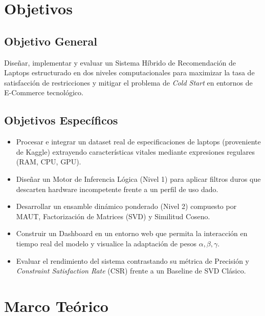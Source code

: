 \documentclass[12pt,a4paper]{report}
\begin{document}
\chapter{Objetivos}
\section{Objetivo General}
Diseñar, implementar y evaluar un Sistema Híbrido de Recomendación de Laptops estructurado en dos niveles computacionales para maximizar la tasa de satisfacción de restricciones y mitigar el problema de \textit{Cold Start} en entornos de E-Commerce tecnológico.

\section{Objetivos Específicos}
\begin{itemize}
    \item Procesar e integrar un dataset real de especificaciones de laptops (proveniente de Kaggle) extrayendo características vitales mediante expresiones regulares (RAM, CPU, GPU).
    \item Diseñar un Motor de Inferencia Lógica (Nivel 1) para aplicar filtros duros que descarten hardware incompetente frente a un perfil de uso dado.
    \item Desarrollar un ensamble dinámico ponderado (Nivel 2) compuesto por MAUT, Factorización de Matrices (SVD) y Similitud Coseno.
    \item Construir un Dashboard en un entorno web que permita la interacción en tiempo real del modelo y visualice la adaptación de pesos $\alpha, \beta, \gamma$.
    \item Evaluar el rendimiento del sistema contrastando su métrica de Precisión y \textit{Constraint Satisfaction Rate} (CSR) frente a un Baseline de SVD Clásico.
\end{itemize}

\chapter{Marco Teórico}
\end{document}
